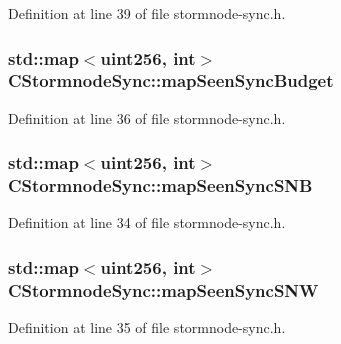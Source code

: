 Definition at line 39 of file stormnode-\/sync.\+h.

\hypertarget{class_c_stormnode_sync_a7555b263aa695f48c81f4051c1a4788c}{}
\subsubsection[{map\+Seen\+Sync\+Budget}]{\setlength{\rightskip}{0pt plus 5cm}std\+::map$<${\bf uint256}, int$>$ C\+Stormnode\+Sync\+::map\+Seen\+Sync\+Budget}\label{class_c_stormnode_sync_a7555b263aa695f48c81f4051c1a4788c}


Definition at line 36 of file stormnode-\/sync.\+h.

\hypertarget{class_c_stormnode_sync_ab5874fbd02e921572983d1530cc7d69e}{}
\subsubsection[{map\+Seen\+Sync\+S\+N\+B}]{\setlength{\rightskip}{0pt plus 5cm}std\+::map$<${\bf uint256}, int$>$ C\+Stormnode\+Sync\+::map\+Seen\+Sync\+S\+N\+B}\label{class_c_stormnode_sync_ab5874fbd02e921572983d1530cc7d69e}


Definition at line 34 of file stormnode-\/sync.\+h.

\hypertarget{class_c_stormnode_sync_aa691249c2bfd876d49d24b82b3df7048}{}
\subsubsection[{map\+Seen\+Sync\+S\+N\+W}]{\setlength{\rightskip}{0pt plus 5cm}std\+::map$<${\bf uint256}, int$>$ C\+Stormnode\+Sync\+::map\+Seen\+Sync\+S\+N\+W}\label{class_c_stormnode_sync_aa691249c2bfd876d49d24b82b3df7048}


Definition at line 35 of file stormnode-\/sync.\+h.

\hypertarget{class_c_stormnode_sync_a2e7baab6709175db874ce9bc325c762d}{}

